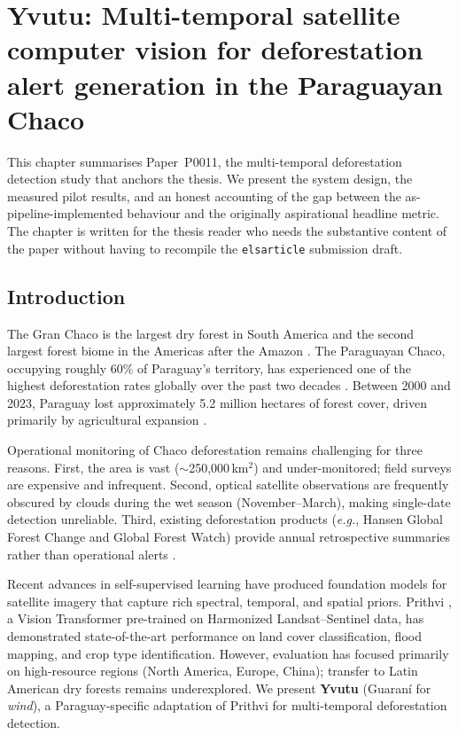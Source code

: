 
\chapter{Yvutu: Multi-temporal satellite computer vision for deforestation
alert generation in the Paraguayan Chaco}\n\label{ch:yvutu}

This chapter summarises Paper~P0011, the multi-temporal deforestation
detection study that anchors the thesis. We present the system design,
the measured pilot results, and an honest accounting of the gap between
the as-pipeline-implemented behaviour and the originally aspirational
headline metric. The chapter is written for the thesis reader who needs
the substantive content of the paper without having to recompile the
\texttt{elsarticle} submission draft.

\section{Introduction}
\label{sec:yvutu-intro}

The Gran Chaco is the largest dry forest in South America and the second
largest forest biome in the Americas after the Amazon \citep{bucher2019}.
The Paraguayan Chaco, occupying roughly 60\% of Paraguay's territory,
has experienced one of the highest deforestation rates globally over the
past two decades \citep{vallejos2020}. Between 2000 and 2023, Paraguay
lost approximately 5.2 million hectares of forest cover, driven
primarily by agricultural expansion \citep{hansen2013}.

Operational monitoring of Chaco deforestation remains challenging for
three reasons. First, the area is vast ($\sim$250{,}000\,km$^2$) and
under-monitored; field surveys are expensive and infrequent. Second,
optical satellite observations are frequently obscured by clouds during
the wet season (November--March), making single-date detection
unreliable. Third, existing deforestation products (\textit{e.g.},
Hansen Global Forest Change and Global Forest Watch) provide annual
retrospective summaries rather than operational alerts
\citep{hansen2013,redford2002}.

Recent advances in self-supervised learning have produced foundation
models for satellite imagery \citep{jakubik2023,cong2022} that capture
rich spectral, temporal, and spatial priors. Prithvi \citep{jakubik2023},
a Vision Transformer pre-trained on Harmonized Landsat--Sentinel data,
has demonstrated state-of-the-art performance on land cover
classification, flood mapping, and crop type identification. However,
evaluation has focused primarily on high-resource regions (North
America, Europe, China); transfer to Latin American dry forests remains
underexplored. We present \textbf{Yvutu} (Guaran\'i for
\textit{wind}), a Paraguay-specific adaptation of Prithvi for
multi-temporal deforestation detection.

